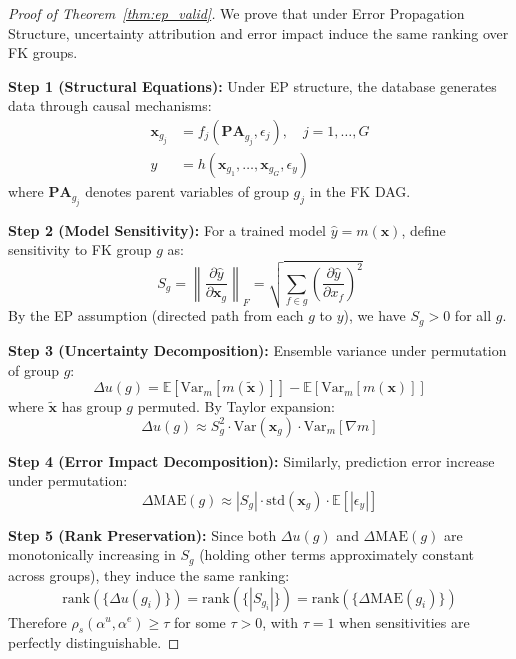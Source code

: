 \documentclass{article}
\begin{document}
\begin{proof}[Proof of Theorem~\ref{thm:ep_valid}]
We prove that under Error Propagation Structure, uncertainty attribution and error impact
induce the same ranking over FK groups.

\textbf{Step 1 (Structural Equations):}
Under EP structure, the database generates data through causal mechanisms:
\begin{align}
\mathbf{x}_{g_j} &= f_j(\mathbf{PA}_{g_j}, \epsilon_j), \quad j = 1, \ldots, G \\
y &= h(\mathbf{x}_{g_1}, \ldots, \mathbf{x}_{g_G}, \epsilon_y)
\end{align}
where $\mathbf{PA}_{g_j}$ denotes parent variables of group $g_j$ in the FK DAG.

\textbf{Step 2 (Model Sensitivity):}
For a trained model $\hat{y} = m(\mathbf{x})$, define sensitivity to FK group $g$ as:
\begin{equation}
S_g = \left\|\frac{\partial \hat{y}}{\partial \mathbf{x}_g}\right\|_F = \sqrt{\sum_{f \in g}\left(\frac{\partial \hat{y}}{\partial x_f}\right)^2}
\end{equation}
By the EP assumption (directed path from each $g$ to $y$), we have $S_g > 0$ for all $g$.

\textbf{Step 3 (Uncertainty Decomposition):}
Ensemble variance under permutation of group $g$:
\begin{equation}
\Delta u(g) = \mathbb{E}\left[\text{Var}_{m}\left[m(\tilde{\mathbf{x}})\right]\right] - \mathbb{E}\left[\text{Var}_{m}\left[m(\mathbf{x})\right]\right]
\end{equation}
where $\tilde{\mathbf{x}}$ has group $g$ permuted. By Taylor expansion:
\begin{equation}
\Delta u(g) \approx S_g^2 \cdot \text{Var}(\mathbf{x}_g) \cdot \text{Var}_{m}[\nabla m]
\end{equation}

\textbf{Step 4 (Error Impact Decomposition):}
Similarly, prediction error increase under permutation:
\begin{equation}
\Delta \text{MAE}(g) \approx |S_g| \cdot \text{std}(\mathbf{x}_g) \cdot \mathbb{E}[|\epsilon_y|]
\end{equation}

\textbf{Step 5 (Rank Preservation):}
Since both $\Delta u(g)$ and $\Delta \text{MAE}(g)$ are monotonically increasing in $S_g$
(holding other terms approximately constant across groups), they induce the same ranking:
\begin{equation}
\text{rank}(\{\Delta u(g_i)\}) = \text{rank}(\{|S_{g_i}|\}) = \text{rank}(\{\Delta \text{MAE}(g_i)\})
\end{equation}
Therefore $\rho_s(\alpha^u, \alpha^e) \geq \tau$ for some $\tau > 0$, with $\tau = 1$ when
sensitivities are perfectly distinguishable.
\end{proof}
\end{document}
